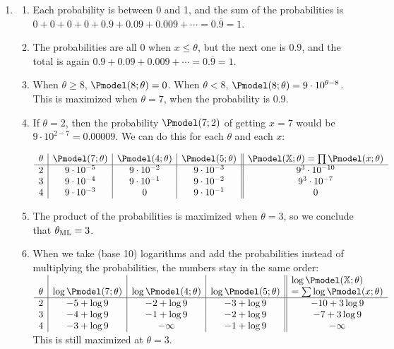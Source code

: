 \documentclass{article}
\begin{document}
\begin{enumerate}
\item \label{ML_ex_maximumlikelihood_solution}
\begin{enumerate}
    \item Each probability is between 0 and 1, and the sum of the probabilities is $0 + 0 + 0 + 0 + 0.9 + 0.09 + 0.009 + \cdots = 0.\overline{9} = 1$.
    \item The probabilities are all 0 when $x \leq \theta$, but the next one is $0.9$, and the total is again $0.9 + 0.09 + 0.009 +\cdots = 0.\overline{9} = 1$.
    \item When $\theta \geq 8$, $\Pmodel(8; \theta) = 0$. When $\theta < 8$, $\Pmodel(8; \theta) = 9\cdot10^{\theta - 8}$. This is maximized when $\theta = 7$, when the probability is $0.9$.
    \item If $\theta = 2$, then the probability $\Pmodel(7; 2)$ of getting $x = 7$ would be $9 \cdot 10^{2-7} = 0.00009$. We can do this for each $\theta$ and each $x$:
        
    $\begin{array}{c|c|c|c||c}
        \theta & \Pmodel(7; \theta) & \Pmodel(4; \theta) & \Pmodel(5; \theta) & \Pmodel(\mathbb{X}; \theta) = \prod \Pmodel(x;\theta) \\
        \hline
        2 & 9 \cdot 10^{-5} & 9 \cdot 10^{-2} & 9 \cdot 10^{-3} & 9^3 \cdot 10^{-10}\\
        3 & 9 \cdot 10^{-4} & 9 \cdot 10^{-1} & 9 \cdot 10^{-2} & 9^3 \cdot 10^{-7}\\
        4 & 9 \cdot 10^{-3} & 0 & 9 \cdot 10^{-1} & 0\\
    \end{array}$
    \item The product of the probabilities is maximized when $\theta = 3$, so we conclude that $\theta_\textnormal{ML} = 3$. 
    \item When we take (base 10) logarithms and add the probabilities instead of multiplying the probabilities, the numbers stay in the same order:
    $\begin{array}{c|c|c|c||c}
        \theta & \log\Pmodel(7; \theta) & \log\Pmodel(4; \theta) & \log\Pmodel(5; \theta) & \vbox{\hbox{\strut$\log\Pmodel(\mathbb{X}; \theta)$}\hbox{\strut $= \sum \log\Pmodel(x;\theta)$}} \\
        \hline
        2 & -5 + \log 9 & -2 + \log 9 & -3 + \log 9 & -10 + 3 \log 9 \\
        3 & -4 + \log 9 & -1 + \log 9 & -2 + \log 9 & -7  + 3 \log 9 \\
        4 & -3 + \log 9 & -\infty     & -1 + \log 9 & -\infty \\
    \end{array}$
    This is still maximized at $\theta = 3$.
\end{enumerate}


\end{enumerate}
\end{document}
